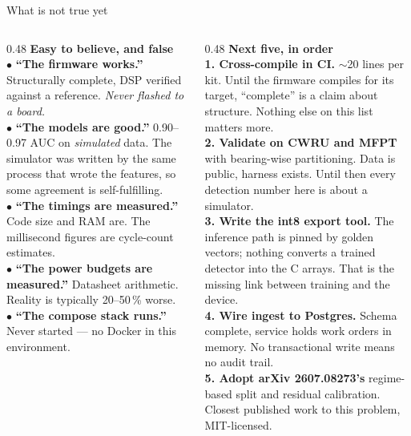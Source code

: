 \documentclass[aspectratio=169,10pt]{beamer}
\begin{document}
\begin{frame}{What is not true yet}
  \small
  \begin{columns}[T]
    \begin{column}{0.48\textwidth}
      \textbf{Easy to believe, and false}
      \\[1.5mm]
      \scriptsize
      $\bullet$ \textbf{``The firmware works.''} Structurally complete, DSP
      verified against a reference. \emph{Never flashed to a board.}\\[1mm]
      $\bullet$ \textbf{``The models are good.''} 0.90--0.97 AUC on
      \emph{simulated} data. The simulator was written by the same process that
      wrote the features, so some agreement is self-fulfilling.\\[1mm]
      $\bullet$ \textbf{``The timings are measured.''} Code size and RAM are.
      The millisecond figures are cycle-count estimates.\\[1mm]
      $\bullet$ \textbf{``The power budgets are measured.''} Datasheet
      arithmetic. Reality is typically 20--50\,\% worse.\\[1mm]
      $\bullet$ \textbf{``The compose stack runs.''} Never started --- no Docker
      in this environment.
    \end{column}
    \begin{column}{0.48\textwidth}
      \textbf{Next five, in order}
      \\[1.5mm]
      \scriptsize
      \textbf{1. Cross-compile in CI.} $\sim$20 lines per kit. Until the firmware
      compiles for its target, ``complete'' is a claim about structure. Nothing
      else on this list matters more.\\[1mm]
      \textbf{2. Validate on CWRU and MFPT} with bearing-wise partitioning. Data
      is public, harness exists. Until then every detection number here is about
      a simulator.\\[1mm]
      \textbf{3. Write the int8 export tool.} The inference path is pinned by
      golden vectors; nothing converts a trained detector into the C arrays.
      That is the missing link between training and the device.\\[1mm]
      \textbf{4. Wire ingest to Postgres.} Schema complete, service holds work
      orders in memory. No transactional write means no audit trail.\\[1mm]
      \textbf{5. Adopt arXiv 2607.08273's} regime-based split and residual
      calibration. Closest published work to this problem, MIT-licensed.
    \end{column}
  \end{columns}
\end{frame}
\end{document}
